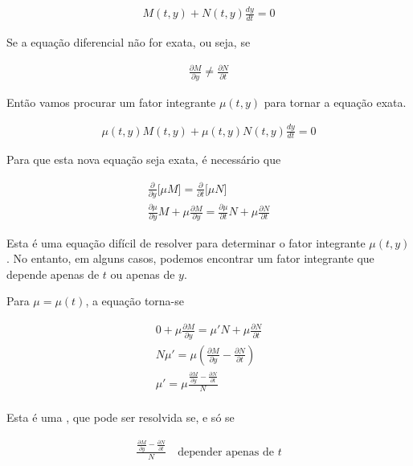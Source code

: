 \documentclass{article}
\begin{document}
\begin{gather*}
\boxed{M(t,y) + N(t,y) \frac{dy}{dt} = 0}
\end{gather*}

Se a equação diferencial não for exata, ou seja, se

\begin{gather*}
\frac{\partial M}{\partial y} \neq \frac{\partial N}{\partial t}
\end{gather*}

Então vamos procurar um fator integrante $\mu(t,y)$ para tornar a equação exata.

\begin{gather*}
\mu(t,y) M(t,y) + \mu(t,y) N(t,y) \frac{dy}{dt} = 0
\end{gather*}

Para que esta nova equação seja exata, é necessário que

\begin{gather*}
\frac{\partial }{\partial y} \Big[ \mu M \Big] = \frac{\partial }{\partial t} \Big[ \mu N \Big] \\
\frac{\partial \mu}{\partial y} M + \mu \frac{\partial M}{\partial y} = \frac{\partial \mu}{\partial t} N + \mu \frac{\partial N}{\partial t}
\end{gather*}

Esta é uma equação difícil de resolver para determinar o fator integrante $\mu(t,y)$.
No entanto, em alguns casos, podemos encontrar um fator integrante que depende apenas de $t$ ou apenas de $y$.

\bigskip

Para $\mu = \mu(t)$, a equação torna-se

\begin{gather*}
0 + \mu \frac{\partial M}{\partial y} = \mu' N + \mu \frac{\partial N}{\partial t} \\
N \mu' = \mu \left( \frac{\partial M}{\partial y} - \frac{\partial N}{\partial t} \right) \\
\mu' = \mu \frac{\frac{\partial M}{\partial y} - \frac{\partial N}{\partial t}}{N} \\
\end{gather*}

Esta é uma , que pode ser resolvida se, e só se

\begin{gather*}
\frac{\frac{\partial M}{\partial y} - \frac{\partial N}{\partial t}}{N} \quad \text{depender apenas de } t
\end{gather*}
\end{document}
